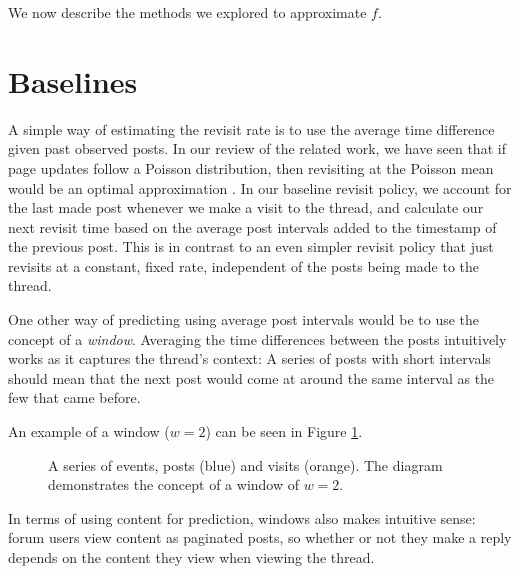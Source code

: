 We now describe the methods we explored to approximate $f$.
\section{Baselines}
A simple way of estimating the revisit rate is to use the average time 
difference given past observed posts. In our review of the related work, we 
have seen that if page updates follow a Poisson distribution, then revisiting at 
the Poisson mean would be an optimal approximation \cite{Coffman1997}.
In our baseline revisit policy, we account for the last made post whenever 
we make a visit to the thread, and calculate our next revisit time based on the 
average post intervals added to the timestamp of the previous post. This is in 
contrast to an even simpler revisit policy that just revisits at a constant, 
fixed rate, independent of the posts being made to the thread.

One other way of predicting using average post intervals would be to use the 
concept of a \emph{window}. Averaging the time differences between the posts 
intuitively works as it captures the thread's context: A series of posts with 
short intervals should mean that the next post would come at around the same 
interval as the few that came before.

An example of a window ($w=2$) can be seen in Figure \ref{fig:event_series}.

\begin{figure}
	\begin{center}
	
	\caption{%
A series of events, posts (blue) and visits (orange).  The diagram demonstrates 
the concept of a window of $w=2$.
}\label{fig:event_series}
	\end{center}
\end{figure}

In terms of using content for prediction, windows also makes intuitive sense: 
forum users view content as paginated posts, so whether or not they make a reply 
depends on the content they view when viewing the thread.  


